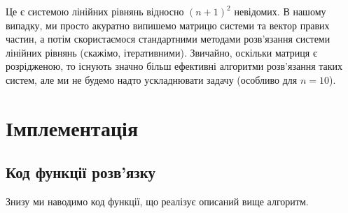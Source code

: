 \documentclass[14pt]{extarticle}
\begin{document}
Це є системою лінійних рівнянь відносно $(n+1)^2$ невідомих. В нашому випадку,
ми просто акуратно випишемо матрицю системи та вектор правих частин, а потім
скористаємося стандартними методами розв'язання системи лінійних рівнянь (скажімо,
ітеративними). Звичайно, оскільки матриця є розрідженою, то існують значно 
більш ефективні алгоритми розв'язання таких систем, але ми не будемо
надто ускладнювати задачу (особливо для $n=10$).

\section{Імплементація}

\subsection{Код функції розв'язку}

Знизу ми наводимо код функції, що реалізує описаний вище алгоритм.
\end{document}
